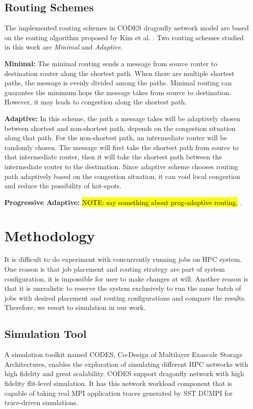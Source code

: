 \documentclass[conference,compsoc]{IEEEtran}
\newcommand{\NOTE}[1]{\hl {NOTE: #1}}
\begin{document}
\subsection{Routing Schemes}
\label{sec:routing}

The implemented routing schemes in CODES dragonfly network model are based on the routing algorithm proposed by Kim et al. \cite{dally-dragonfly}. Two routing schemes studied in this work are \emph{Minimal} and \emph{Adaptive}.

\textbf{Minimal:} The minimal routing sends a message from source router to destination router along the shortest path. When there are multiple shortest paths, the message is evenly divided among the paths. Minimal routing can guarantee the minimum hops the message takes from source to destination. However, it may leads to congestion along the shortest path. 


\textbf{Adaptive:} In this scheme, the path a message takes will be adaptively chosen between shortest and non-shortest path, depends on the congestion situation along that path. For the non-shortest path, an intermediate router will be randomly chosen. The message will first take the shortest path from source to that intermediate router, then it will take the shortest path between the intermediate router to the destination. Since adaptive scheme chooses routing path adaptively based on the congestion situation, it can void local congestion and reduce the possibility of hot-spots. 

\textbf{Progressive Adaptive:} \NOTE{say something about prog-adaptive routing.} \cite{won-prog-adaptive}.




\section{Methodology}
\label{sec: methodology}

It is difficult to do experiment with concurrently running jobs on HPC system. One reason is that job placement and routing strategy are part of system configuration, it is impossible for user to make changes at will. Another reason is that it is unrealistic to reserve the system exclusively to run the same batch of jobs with desired placement and routing configurations and compare the results. Therefore, we resort to simulation in our work.

\subsection{Simulation Tool}
A simulation toolkit named CODES, Co-Design of Multilayer Exascale Storage Architectures, enables the exploration of simulating different HPC networks with high fidelity and great scalability\cite{codes}.  CODES support dragonfly network with high fidelity flit-level simulation\cite{codes-dragonfly}. It has this network workload component that is capable of taking real MPI application traces generated by SST DUMPI\cite{sst} for trace-driven simulations.
\end{document}
